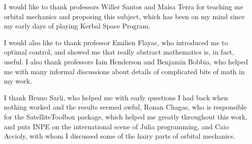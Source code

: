 I would like to thank professors Willer Santos and Maísa Terra for teaching me orbital mechanics and proposing this subject, which has been on my mind since my early days of playing Kerbal Space Program. 

I would also like to thank professor Emilien Flayac, who introduced me to optimal control, and showed me that really abstract mathematics is, in fact, useful. I also thank professors Iain Henderson and Benjamin Bobbia, who helped me with many informal discussions about details of complicated bits of math in my work.

I thank Bruno Sarli, who helped me with early questions I had back when nothing worked and the results seemed awful, Ronan Chagas, who is responsible for the SatelliteToolbox package, which helped me greatly throughout this work, and puts INPE on the international scene of Julia programming, and Caio Accioly, with whom I discussed some of the hairy parts of orbital mechanics.